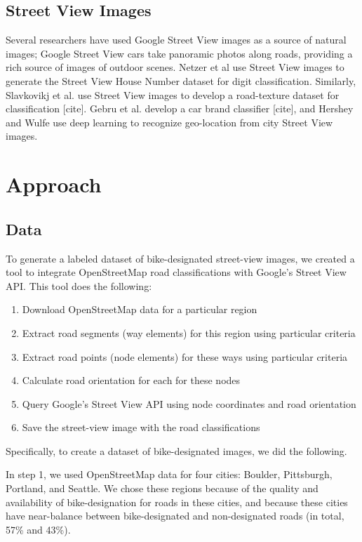 \documentclass[10pt,twocolumn,letterpaper]{article}
\begin{document}
\subsection{Street View Images}
Several researchers have used Google Street View images as a source of natural images; Google Street View cars take panoramic photos along roads, providing a rich source of images of outdoor scenes. Netzer et al use Street View images to generate the Street View House Number dataset for digit classification. Similarly, Slavkovikj et al. use Street View images to develop a road-texture dataset for classification [cite]. Gebru et al. develop a car brand classifier [cite], and Hershey and Wulfe use deep learning to recognize geo-location from city Street View images.

\section{Approach}
\label{sec:approach}


\subsection{Data}
To generate a labeled dataset of bike-designated street-view images, we created a tool to integrate OpenStreetMap road classifications with Google's Street View API. This tool does the following:
\begin{enumerate}
\item Download OpenStreetMap data for a particular region
\item Extract road segments (way elements) for this region using particular criteria
\item Extract road points (node elements) for these ways using particular criteria
\item Calculate road orientation for each for these nodes
\item Query Google's Street View API using node coordinates and road orientation
\item Save the street-view image with the road classifications
\end{enumerate}
Specifically, to create a dataset of bike-designated images, we did the following.

In step 1, we used OpenStreetMap data for four cities: Boulder, Pittsburgh, Portland, and Seattle. We chose these regions because of the quality and availability of bike-designation for roads in these cities, and because these cities have near-balance between bike-designated and non-designated roads (in total, 57\% and 43\%).
\end{document}
